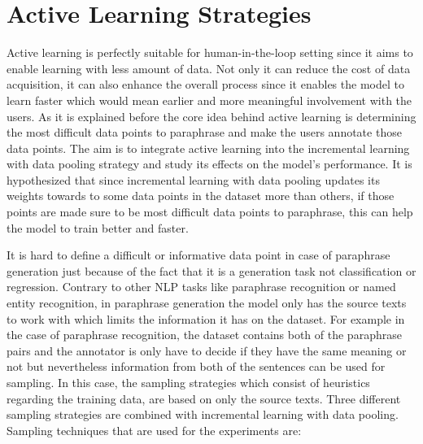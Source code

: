 \section{Active Learning Strategies} \label{actives}

Active learning is perfectly suitable for human-in-the-loop setting since it aims to enable learning with less amount of data. Not only it can reduce the cost of data acquisition, it can also enhance the overall process since it enables the model to learn faster which would mean earlier and more meaningful involvement with the users. As it is explained before the core idea behind active learning is determining the most difficult data points to paraphrase and make the users annotate those data points. The aim is to integrate active learning into the incremental learning with data pooling strategy and study its effects on the model's performance. It is hypothesized that since incremental learning with data pooling updates its weights towards to some data points in the dataset more than others, if those points are made sure to be most difficult data points to paraphrase, this can help the model to train better and faster.

It is hard to define a difficult or informative data point in case of paraphrase generation just because of the fact that it is a generation task not classification or regression. Contrary to other NLP tasks like paraphrase recognition or named entity recognition, in paraphrase generation the model only has the source texts to work with which limits the information it has on the dataset. For example in the case of paraphrase recognition, the dataset contains both of the paraphrase pairs and the annotator is only have to decide if they have the same meaning or not but nevertheless information from both of the sentences can be used for sampling. In this case, the sampling strategies which consist of heuristics regarding the training data, are based on only the source texts. Three different sampling strategies are combined with incremental learning with data pooling. Sampling techniques that are used for the experiments are:

